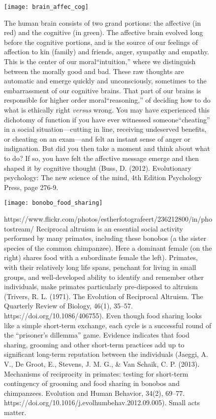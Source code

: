 \documentclass[amstex,12pt]{book}
\begin{document}
\newpage
\begin{figure}[p]
\centering
  \texttt{[image: brain\_affec\_cog]}%

\caption{The human brain consists of two grand portions: the affective (in red) and the cognitive (in green). The affective brain evolved long before the cognitive portions, and is the source of our feelings of affection to kin (family) and friends, anger, sympathy and empathy. This is the center of our moral``intuition,'' where we distinguish between the morally good and bad. These raw thoughts are automatic and emerge quickly and unconsciously, sometimes to the embarrassment of our cognitive brains. That part of our brains is responsible for higher order moral``reasoning,'' of deciding how to do what is ethically right \textit{versus} wrong. You may have experienced this dichotomy of function if you have ever witnessed someone``cheating'' in a social situation---cutting in line, receiving undeserved benefits, or cheating on an exam---and felt an instant sense of anger or indignation. But did you then take a moment and think about what to do? If so, you have felt the affective message emerge and then shaped it by cognitive thought (Buss, D. (2012). Evolutionary psychology: The new science of the mind, 4th Edition Psychology Press, page 276-9. }
\label{fig:brain_affec_cog}
\end{figure}

\newpage
\begin{figure}[p]
\centering
  \texttt{[image: bonobo\_food\_sharing]}%

\caption{https://www.flickr.com/photos/estherfotografeert/236212800/in/photostream/ Reciprocal altruism is an essential social activity performed by many primates, including these bonobos (a the sister species of the common chimpanzee). Here a dominant female (on the right) shares food with a subordinate female the left). Primates, with their relatively long life spans, penchant for living in small groups, and well-developed ability to identify and remember other individuals, make primates particularly pre-disposed to altruism (Trivers, R. L. (1971). The Evolution of Reciprocal Altruism. The Quarterly Review of Biology, 46(1), 35–57. https://doi.org/10.1086/406755). Even though food sharing looks like a simple short-term exchange, each cycle is a successful round of the ``prisoner's dillemma'' game. Evidence indicates that food sharing, grooming and other short-term practices add up to significant long-term reputation between the individuals (Jaeggi, A. V., De Groot, E., Stevens, J. M. G., \& Van Schaik, C. P. (2013). Mechanisms of reciprocity in primates: testing for short-term contingency of grooming and food sharing in bonobos and chimpanzees. Evolution and Human Behavior, 34(2), 69–77. https://doi.org/10.1016/j.evolhumbehav.2012.09.005). Small acts matter.}
\label{fig:bonobos_food_sharing}
\end{figure}
\end{document}
